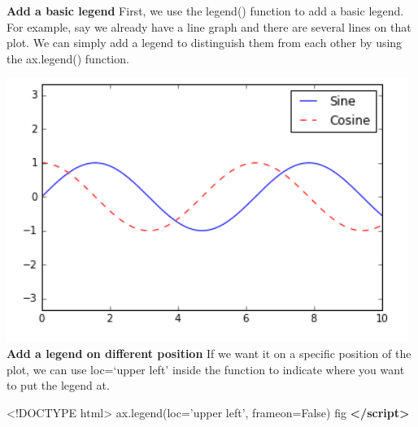 \documentclass[]{book}
\newenvironment{Shaded}{\begin{snugshade}}{\end{snugshade}}
\newcommand{\KeywordTok}[1]{\textcolor[rgb]{0.13,0.29,0.53}{\textbf{#1}}}
\newcommand{\DataTypeTok}[1]{\textcolor[rgb]{0.13,0.29,0.53}{#1}}
\newcommand{\NormalTok}[1]{#1}
\theoremstyle{definition}
\theoremstyle{definition}
\theoremstyle{definition}
\theoremstyle{remark}
\begin{document}
\textbf{Add a basic legend} First, we use the legend() function to add a
basic legend. For example, say we already have a line graph and there
are several lines on that plot. We can simply add a legend to
distinguish them from each other by using the ax.legend() function.

\begin{Shaded}
\end{Shaded}

\includegraphics{images/legend1.png} \textbf{Add a legend on different
position} If we want it on a specific position of the plot, we can use
loc=`upper left' inside the function to indicate where you want to put
the legend at.

\begin{Shaded}
\begin{Highlighting}[]
\DataTypeTok{<!DOCTYPE }\NormalTok{html}\DataTypeTok{>}
\NormalTok{ax.legend(loc='upper left', frameon=False)}
\NormalTok{fig}
\KeywordTok{</script>}
\end{Highlighting}
\end{Shaded}
\end{document}
